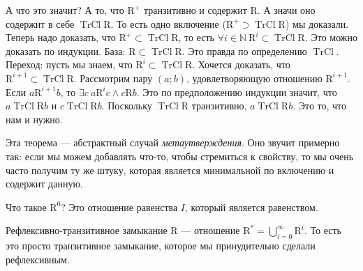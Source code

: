 \documentclass{article}
\begin{document}
\begin{itemize}
\begin{Proof}
\begin{Proof}
            \end{Proof}
            А что это значит? А то, что $\mathrm R^+$ транзитивно и содержит $\mathrm R$. А значи оно содержит в себе $\operatorname{TrCl}\mathrm R$. То есть одно включение ($\mathrm R^+\supset\operatorname{TrCl}\mathrm R$) мы доказали.\\
            Теперь надо доказать, что $\mathrm R^+\subset\operatorname{TrCl}\mathrm R$, то есть $\forall i\in\mathbb N~\mathrm R^i\subset\operatorname{TrCl}\mathrm R$. Это можно доказать по индукции. База: $\mathrm R\subset\operatorname{TrCl}\mathrm R$. Это правда по определению $\operatorname{TrCl}$. Переход: пусть мы знаем, что $\mathrm R^i\subset\operatorname{TrCl}\mathrm R$. Хочется доказать, что $\mathrm R^{i+1}\subset\operatorname{TrCl}\mathrm R$. Рассмотрим пару $(a;b)$, удовлетворяющую отношению $\mathrm R^{i+1}$. Если $a\mathrm R^{i+1}b$, то $\exists c~a\mathrm R^ic\land c\mathrm Rb$. Это по предположению индукции значит, что $a\operatorname{TrCl}\mathrm Rb$ и $c\operatorname{TrCl}\mathrm Rb$. Поскольку $\operatorname{TrCl}\mathrm R$ транзитивно, $a\operatorname{TrCl}\mathrm Rb$. Это то, что нам и нужно.
        \end{Proof}
        \begin{Comment}
            Эта теорема --- абстрактный случай \textit{метаутверждения}. Оно звучит примерно так: если мы можем добавлять что-то, чтобы стремиться к свойству, то мы очень часто получим ту же штуку, которая является минимальной по включению и содержит данную.
        \end{Comment}
        \begin{Comment}
            Что такое $\mathrm R^0$? Это отношение равенства $I$, который является равенством.
        \end{Comment}
        \dfn Рефлексивно-транзитивное замыкание $\mathrm R$ --- отношение $\mathrm R^*=\bigcup\limits_{i=0}^\infty\mathrm R^i$. То есть это просто транзитивное замыкание, которое мы принудительно сделали рефлексивным.
    \end{itemize}
\end{document}
